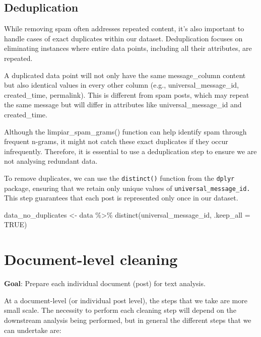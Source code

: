 \documentclass[
  letterpaper,
  DIV=11,
  numbers=noendperiod]{scrreprt}
\newenvironment{Shaded}{\begin{snugshade}}{\end{snugshade}}
\newcommand{\AttributeTok}[1]{\textcolor[rgb]{0.40,0.45,0.13}{#1}}
\newcommand{\ConstantTok}[1]{\textcolor[rgb]{0.56,0.35,0.01}{#1}}
\newcommand{\FunctionTok}[1]{\textcolor[rgb]{0.28,0.35,0.67}{#1}}
\newcommand{\NormalTok}[1]{\textcolor[rgb]{0.00,0.23,0.31}{#1}}
\newcommand{\OtherTok}[1]{\textcolor[rgb]{0.00,0.23,0.31}{#1}}
\newcommand{\SpecialCharTok}[1]{\textcolor[rgb]{0.37,0.37,0.37}{#1}}
\begin{document}
\subsection{Deduplication}\label{deduplication}

While removing spam often addresses repeated content, it's also
important to handle cases of exact duplicates within our dataset.
Deduplication focuses on eliminating instances where entire data points,
including all their attributes, are repeated.

A duplicated data point will not only have the same message\_column
content but also identical values in every other column (e.g.,
universal\_message\_id, created\_time, permalink). This is different
from spam posts, which may repeat the same message but will differ in
attributes like universal\_message\_id and created\_time.

Although the limpiar\_spam\_grams() function can help identify spam
through frequent n-grams, it might not catch these exact duplicates if
they occur infrequently. Therefore, it is essential to use a
deduplication step to ensure we are not analysing redundant data.

To remove duplicates, we can use the \texttt{distinct()} function from
the \texttt{dplyr} package, ensuring that we retain only unique values
of \texttt{universal\_message\_id.} This step guarantees that each post
is represented only once in our dataset.

\begin{Shaded}
\begin{Highlighting}[]
\NormalTok{data\_no\_duplicates }\OtherTok{\textless{}{-}}\NormalTok{ data }\SpecialCharTok{\%\textgreater{}\%} 
  \FunctionTok{distinct}\NormalTok{(universal\_message\_id, }\AttributeTok{.keep\_all =} \ConstantTok{TRUE}\NormalTok{)}
\end{Highlighting}
\end{Shaded}

\section{Document-level cleaning}\label{document-level-cleaning}

\textbf{Goal}: Prepare each individual document (post) for text
analysis.

At a document-level (or individual post level), the steps that we take
are more small scale. The necessity to perform each cleaning step will
depend on the downstream analysis being performed, but in general the
different steps that we can undertake are:
\end{document}
